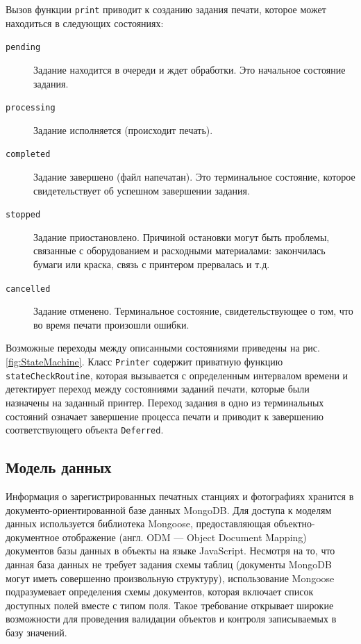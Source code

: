 \documentclass[a4paper,14pt,href]{article}
\begin{document}
Вызов функции \texttt{print} приводит к созданию задания печати, которое может находиться в следующих состояниях:
\begin{description}
  \item[\texttt{pending}] Задание находится в очереди и ждет обработки. Это начальное состояние задания.
  \item[\texttt{processing}] Задание исполняется (происходит печать).
  \item[\texttt{completed}] Задание завершено (файл напечатан). Это терминальное состояние, которое свидетельствует
  об успешном завершении задания.
  \item[\texttt{stopped}] Задание приостановлено. Причиной остановки могут быть проблемы, связанные с оборудованием и
  расходными материалами: закончилась бумаги или краска, связь с принтером прервалась и т.д.
  \item[\texttt{cancelled}] Задание отменено. Терминальное состояние, свидетельствующее о том, что во время печати
  произошли ошибки.
\end{description}

Возможные переходы между описанными состояниями приведены на рис. \ref{fig:StateMachine}. Класс \texttt{Printer} содержит
приватную функцию \texttt{stateCheckRou\-ti\-ne}, которая вызывается с определенным интервалом времени и детектирует
переход между состояниями заданий печати, которые были назначены на заданный принтер. Переход задания в одно из терминальных
состояний означает завершение процесса печати и приводит к завершению соответствующего объекта \texttt{Deferred}.

\subsection{Модель данных}
Информация о зарегистрированных печатных станциях и фотографиях хранится в документо-ориентированной базе данных MongoDB.
Для доступа к моделям данных используется библиотека Mongoose\cite{Mongoose}, предоставляющая объектно-документное отображение
(англ. ODM \- --- Object Document Mapping) документов базы данных в объекты на языке JavaScript. Несмотря на то, что данная
база данных не требует задания схемы таблиц (документы MongoDB могут иметь совершенно произвольную структуру), использование
Mongoose подразумевает определения схемы документов, которая включает список доступных полей вместе с типом поля. Такое
требование открывает широкие возможности для проведения валидации объектов и контроля записываемых в базу значений.
\end{document}
